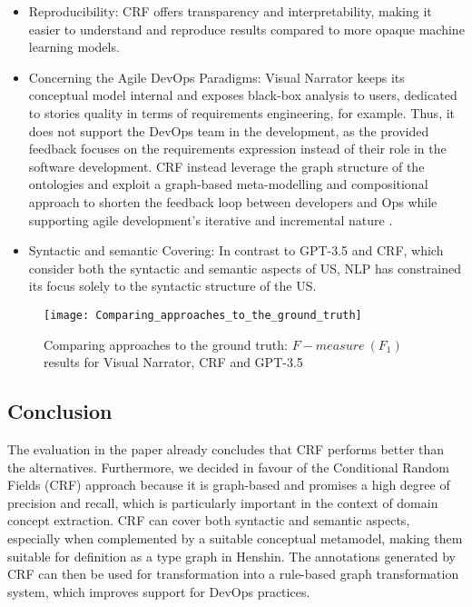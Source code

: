 \begin{itemize}
\item Reproducibility: CRF offers transparency and interpretability, making it easier to understand and reproduce results compared to more opaque machine learning models.
\item Concerning the Agile DevOps Paradigms: Visual Narrator keeps its conceptual model internal and exposes black-box analysis to users, dedicated to stories quality in terms of requirements engineering, for example. Thus, it does not support the DevOps team in the development, as the provided feedback focuses on the requirements expression instead of their role in the software development. CRF instead leverage the graph structure of the ontologies and exploit a graph-based meta-modelling and compositional approach to shorten the feedback loop between developers and Ops while supporting agile development’s iterative and incremental nature \cite{mosser2022modelling}.
\item Syntactic and semantic Covering: In contrast to GPT-3.5 and CRF, which consider both the syntactic and semantic aspects of US, NLP has constrained its focus solely to the syntactic structure of the US.
\end{itemize}
\begin{figure}
\center
\texttt{[image: Comparing\_approaches\_to\_the\_ground\_truth]}
\caption{Comparing approaches to the ground truth: $F-measure \ (F_1)$ results for Visual Narrator, CRF and GPT-3.5  \cite{arulmohan2023extracting}}\label{fig:coparing_approaches}
\end{figure}
\subsection{Conclusion}\label{crf_conclusion}
The evaluation in the paper \cite{arulmohan2023extracting} already concludes that CRF performs better than the alternatives. Furthermore, we decided in favour of the Conditional Random Fields (CRF) approach because it is graph-based and promises a high degree of precision and recall, which is particularly important in the context of domain concept extraction. CRF can cover both syntactic and semantic aspects, especially when complemented by a suitable conceptual metamodel, making them suitable for definition as a type graph in Henshin. The annotations generated by CRF can then be used for transformation into a rule-based graph transformation system, which improves support for DevOps practices.


